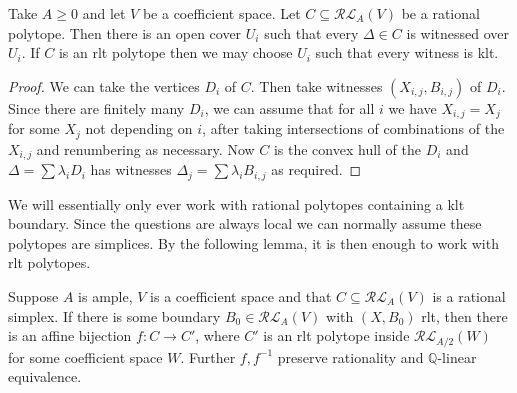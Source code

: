 \documentclass[a4paper,12pt]{amsart}
\begin{document}
	\begin{lemma}
		Take $A \geq 0$ and let $V$ be a coefficient space. Let $C \subseteq \mathcal{RL}_{A}(V)$ be a rational polytope. Then there is an open cover $U_{i}$ such that every $\Delta \in C$ is witnessed over $U_{i}$. If $C$ is an rlt polytope then we may choose $U_{i}$ such that every witness is klt.
	\end{lemma}
	\begin{proof}
		We can take the vertices $D_{i}$ of $C$. Then take witnesses $(X_{i,j}, B_{i,j})$ of $D_{i}$. Since there are finitely many $D_{i}$, we can assume that for all $i$ we have $X_{i,j}=X_{j}$ for some $X_{j}$ not depending on $i$, after taking intersections of combinations of the $X_{i,j}$ and renumbering as necessary. Now $C$ is the convex hull of the $D_{i}$ and $\Delta= \sum \lambda_{i}D_{i}$ has witnesses $\Delta_{j}= \sum \lambda_{i}B_{i,j}$ as required.
	\end{proof}
	
	We will essentially only ever work with rational polytopes containing a klt boundary. Since the questions are always local we can normally assume these polytopes are simplices. By the following lemma, it is then enough to work with rlt polytopes.
	
	\begin{lemma}\label{rlt-repl}
		Suppose $A$ is ample, $V$ is a coefficient space and that $C\subseteq \mathcal{RL}_{A}(V)$ is a rational simplex. If there is some boundary $B_{0} \in \mathcal{RL}_{A}(V)$ with $(X,B_{0})$ rlt, then there is an affine bijection $f:C \to C'$, where $C'$ is an rlt polytope inside $\mathcal{RL}_{A/2}(W)$ for some coefficient space $W$. Further $f, f^{-1}$ preserve rationality and $\mathbb{Q}$-linear equivalence.
	\end{lemma}
\end{document}
